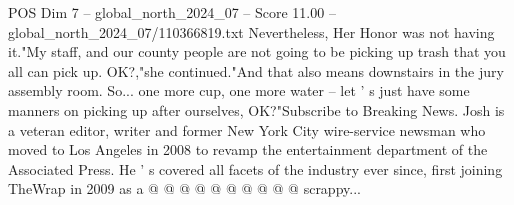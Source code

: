 \begin{textsample}{POS Dim 7 – global\_north\_2024\_07 – Score 11.00 – global\_north\_2024\_07/110366819.txt}
Nevertheless, Her Honor was not having it."My staff, and our county people are not going to be picking up trash that you all can pick up.
OK?,"she continued."And that also means downstairs in the jury assembly room.
So... one more cup, one more water -- let ' s just have some manners on picking up after ourselves, OK?"Subscribe to Breaking News.
Josh is a veteran editor, writer and former New York City wire-service newsman who moved to Los Angeles in 2008 to revamp the entertainment department of the Associated Press.
He ' s covered all facets of the industry ever since, first joining TheWrap in 2009 as a @ @ @ @ @ @ @ @ @ @ scrappy...

\end{textsample}
